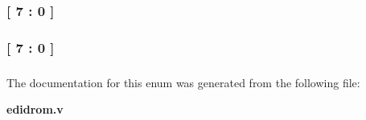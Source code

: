 \subsubsection[{adr}]{ {\bfseries \textcolor{vhdlchar}{[}\textcolor{vhdlchar}{ } \textcolor{vhdldigit}{7} \textcolor{vhdlchar}{ }\textcolor{vhdlchar}{\-:}\textcolor{vhdlchar}{ } \textcolor{vhdldigit}{0} \textcolor{vhdlchar}{ }\textcolor{vhdlchar}{]}\textcolor{vhdlchar}{ }} \hspace{0.3cm}}\label{enum1edidrom_a07db91328e8215806bc51d690337f4f2}
\subsubsection[{data}]{ {\bfseries \textcolor{vhdlchar}{[}\textcolor{vhdlchar}{ } \textcolor{vhdldigit}{7} \textcolor{vhdlchar}{ }\textcolor{vhdlchar}{\-:}\textcolor{vhdlchar}{ } \textcolor{vhdldigit}{0} \textcolor{vhdlchar}{ }\textcolor{vhdlchar}{]}\textcolor{vhdlchar}{ }} \hspace{0.3cm}}\label{enum1edidrom_add2369651b8eb9a36a43c7c38aa0b706}
\subsubsection[{data}]{ {\bfseries \textcolor{vhdlchar}{ }} \hspace{0.3cm}}\label{enum1edidrom_a72d47feeea318e0f0de1e9e16ec84232}


The documentation for this enum was generated from the following file\-:\begin{DoxyCompactItemize}
\item 
{\bf edidrom.\-v}\end{DoxyCompactItemize}
